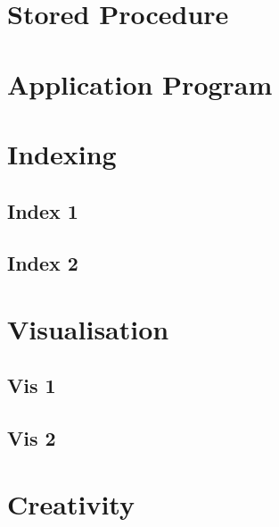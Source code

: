 \documentclass[a4paper,11pt]{article}
\begin{document}
\section{Stored Procedure}

\section{Application Program}

\section{Indexing}

\subsection{Index 1}

\subsection{Index 2}

\section{Visualisation}

\subsection{Vis 1}

\subsection{Vis 2}

\section{Creativity}
\end{document}
